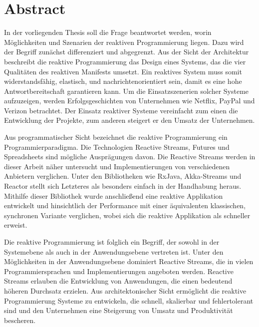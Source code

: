 \chapter*{Abstract}
In der vorliegenden Thesis soll die Frage beantwortet werden, worin Möglichkeiten und Szenarien der reaktiven Programmierung liegen. Dazu wird der Begriff zunächst differenziert und abgegrenzt. Aus der Sicht der Architektur beschreibt die reaktive Programmierung das Design eines Systems, das die vier Qualitäten des reaktiven Manifests umsetzt. Ein reaktives System muss somit widerstandsfähig, elastisch, und nachrichtenorientiert sein, damit es eine hohe Antwortbereitschaft garantieren kann. Um die Einsatzszenerien solcher Systeme aufzuzeigen, werden Erfolgsgeschichten von Unternehmen wie Netflix, PayPal und Verizon betrachtet. Der Einsatz reaktiver Systeme vereinfacht zum einen die Entwicklung der Projekte, zum anderen steigert er den Umsatz der Unternehmen.

Aus programmatischer Sicht bezeichnet die reaktive Programmierung ein Programmierparadigma. Die Technologien Reactive Streams, Futures und Spreadsheets sind mögliche Ausprägungen davon. Die Reactive Streams werden in dieser Arbeit näher untersucht und Implementierungen von verschiedenen Anbietern verglichen. Unter den Bibliotheken wie RxJava, Akka-Streams und Reactor stellt sich Letzteres als besonders einfach in der Handhabung heraus. Mithilfe dieser Bibliothek wurde anschließend eine reaktive Applikation entwickelt und hinsichtlich der Performance mit einer äquivalenten klassischen, synchronen Variante verglichen, wobei sich die reaktive Applikation als schneller erweist.  

Die reaktive Programmierung ist folglich ein Begriff, der sowohl in der Systemebene als auch in der Anwendungsebene vertreten ist. Unter den Möglichkeiten in der Anwendungsebene dominiert Reactive Streams, die in vielen Programmiersprachen und Implementierungen angeboten werden. Reactive Streams erlauben die Entwicklung von Anwendungen, die einen bedeutend höheren Durchsatz erzielen. Aus architektonischer Sicht ermöglicht die reaktive Programmierung Systeme zu entwickeln, die schnell, skalierbar und fehlertolerant sind und den Unternehmen eine Steigerung von Umsatz und Produktivität bescheren.


